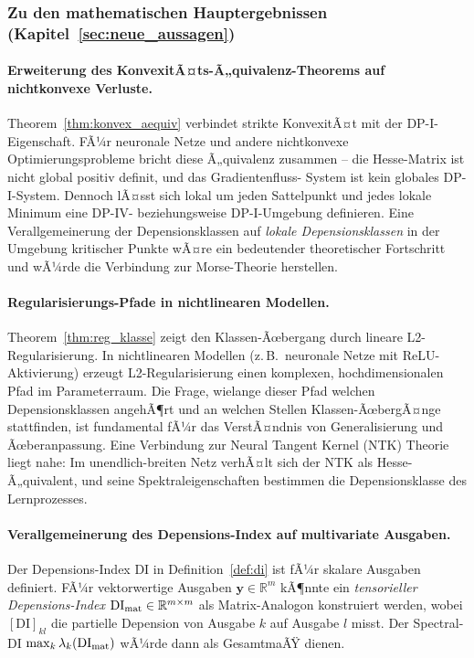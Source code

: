 ﻿\documentclass[12pt, a4paper]{article}
\theoremstyle{definition}
\theoremstyle{remark}
\newcommand{\R}{\mathbb{R}}
\newcommand{\vy}{\bm{y}}
\begin{document}
\subsubsection{Zu den mathematischen Hauptergebnissen (Kapitel~\ref{sec:neue_aussagen})}

\paragraph{Erweiterung des KonvexitÃ¤ts-Ã„quivalenz-Theorems auf nichtkonvexe Verluste.}
Theorem~\ref{thm:konvex_aequiv} verbindet strikte KonvexitÃ¤t mit der DP-I-Eigenschaft.
FÃ¼r neuronale Netze und andere nichtkonvexe Optimierungsprobleme bricht diese Ã„quivalenz
zusammen -- die Hesse-Matrix ist nicht global positiv definit, und das Gradientenfluss-
System ist kein globales DP-I-System. Dennoch lÃ¤sst sich lokal um jeden Sattelpunkt
und jedes lokale Minimum eine DP-IV- beziehungsweise DP-I-Umgebung definieren. Eine
Verallgemeinerung der Depensionsklassen auf \emph{lokale Depensionsklassen} in der
Umgebung kritischer Punkte wÃ¤re ein bedeutender theoretischer Fortschritt und wÃ¼rde
die Verbindung zur Morse-Theorie herstellen.

\paragraph{Regularisierungs-Pfade in nichtlinearen Modellen.}
Theorem~\ref{thm:reg_klasse} zeigt den Klassen-Ãœbergang durch lineare L2-Regularisierung.
In nichtlinearen Modellen (z.\,B.\ neuronale Netze mit ReLU-Aktivierung) erzeugt
L2-Regularisierung einen komplexen, hochdimensionalen Pfad im Parameterraum. Die
Frage, wielange dieser Pfad welchen Depensionsklassen angehÃ¶rt und an welchen Stellen
Klassen-ÃœbergÃ¤nge stattfinden, ist fundamental fÃ¼r das VerstÃ¤ndnis von
Generalisierung und Ãœberanpassung. Eine Verbindung zur Neural Tangent Kernel (NTK)
Theorie liegt nahe: Im unendlich-breiten Netz verhÃ¤lt sich der NTK als Hesse-Ã„quivalent,
und seine Spektraleigenschaften bestimmen die Depensionsklasse des Lernprozesses.

\paragraph{Verallgemeinerung des Depensions-Index auf multivariate Ausgaben.}
Der Depensions-Index DI in Definition~\ref{def:di} ist fÃ¼r skalare Ausgaben definiert.
FÃ¼r vektorwertige Ausgaben $\vy \in \R^m$ kÃ¶nnte ein \emph{tensorieller Depensions-Index}
$\mathrm{DI}_{\rm mat} \in \R^{m \times m}$ als Matrix-Analogon konstruiert werden,
wobei $[\mathrm{DI}]_{kl}$ die partielle Depension von Ausgabe $k$ auf Ausgabe $l$
misst. Der Spectral-DI $\max_k \lambda_k(\mathrm{DI}_{\rm mat})$ wÃ¼rde dann als
GesamtmaÃŸ dienen.
\end{document}

